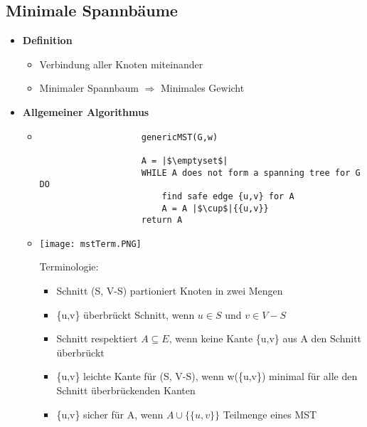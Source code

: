 \subsection{Minimale Spannbäume}
    \begin{itemize}
        \item \textbf{Definition}
            \begin{itemize}
                \item Verbindung aller Knoten miteinander
                \item Minimaler Spannbaum $\Rightarrow$ Minimales Gewicht
            \end{itemize}

        \item \textbf{Allgemeiner Algorithmus}
            \begin{itemize}
                \item[]
                    \begin{verbatim}
                    genericMST(G,w)

                    A = |$\emptyset$|
                    WHILE A does not form a spanning tree for G DO
                        find safe edge {u,v} for A
                        A = A |$\cup$|{{u,v}}
                    return A
                    \end{verbatim}
                \item[]
                    \begin{minipage}{0.35\textwidth}
                        \texttt{[image: mstTerm.PNG]}
                    \end{minipage}
                    \begin{minipage}{0.55\textwidth}
                        Terminologie:
                            \begin{itemize}
                                \item Schnitt (S, V-S) partioniert Knoten in zwei Mengen
                                \item \{u,v\} überbrückt Schnitt, wenn $u \in S$ und $v \in V-S$
                                \item Schnitt respektiert $A \subseteq E$, wenn keine Kante \{u,v\} aus A den Schnitt überbrückt
                                \item \{u,v\} leichte Kante für (S, V-S), wenn w(\{u,v\}) minimal für alle den Schnitt überbrückenden Kanten
                                \item \{u,v\} sicher für A, wenn $A \cup \{\{u,v\}\}$ Teilmenge eines MST
                            \end{itemize}
                    \end{minipage}
            \end{itemize}
        

\end{itemize}
